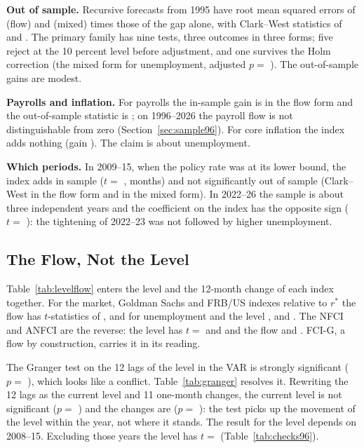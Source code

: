 \documentclass[11pt]{article}
\newcommand{\rs}{r^{*}}
\begin{document}
\textbf{Out of sample.} Recursive forecasts from 1995 have root mean squared errors of  (flow) and  (mixed) times those of the gap alone, with Clark--West statistics of  and . The primary family has nine tests, three outcomes in three forms; five reject at the 10 percent level before adjustment, and one survives the Holm correction (the mixed form for unemployment, adjusted $p=$ ). The out-of-sample gains are modest.

\textbf{Payrolls and inflation.} For payrolls the in-sample gain is  in the flow form and the out-of-sample statistic is ; on 1996--2026 the payroll flow is not distinguishable from zero (Section~\ref{sec:sample96}). For core inflation the index adds nothing (gain ). The claim is about unemployment.

\textbf{Which periods.} In 2009--15, when the policy rate was at its lower bound, the index adds in sample ($t=$ ,  months) and not significantly out of sample (Clark--West  in the flow form and  in the mixed form). In 2022--26 the sample is about three independent years and the coefficient on the index has the opposite sign ($t=$ ): the tightening of 2022--23 was not followed by higher unemployment.


\subsection{The Flow, Not the Level}\label{sec:levelflow}
Table~\ref{tab:levelflow} enters the level and the 12-month change of each index together. For the market, Goldman Sachs and FRB/US indexes relative to $\rs$ the flow has $t$-statistics of ,  and  for unemployment and the level ,  and . The NFCI and ANFCI are the reverse: the level has $t=$  and  and the flow  and . FCI-G, a flow by construction, carries it in its reading.



The Granger test on the 12 lags of the level in the VAR is strongly significant ($p=$ ), which looks like a conflict. Table~\ref{tab:granger} resolves it. Rewriting the 12 lags as the current level and 11 one-month changes, the current level is not significant ($p=$ ) and the changes are ($p=$ ): the test picks up the movement of the level within the year, not where it stands. The result for the level depends on 2008--15. Excluding those years the level has $t=$  (Table~\ref{tab:checks96}).
\end{document}
